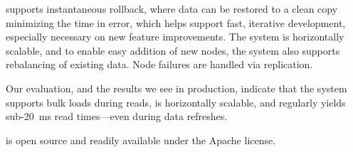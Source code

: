 \projectname{} supports instantaneous rollback, where data can be
restored to a clean copy minimizing the time in error, which helps
support fast, iterative development, especially necessary on new
feature improvements. The system is horizontally scalable, and to
enable easy addition of new nodes, the system also supports
rebalancing of existing data. Node failures are handled via
replication.

Our evaluation, and the results we see in production, indicate that
the system supports bulk loads during reads, is horizontally scalable,
and regularly yields sub-20~ms read times---even during data
refreshes.

\projectname{} is open source and readily available under the Apache
license. 

